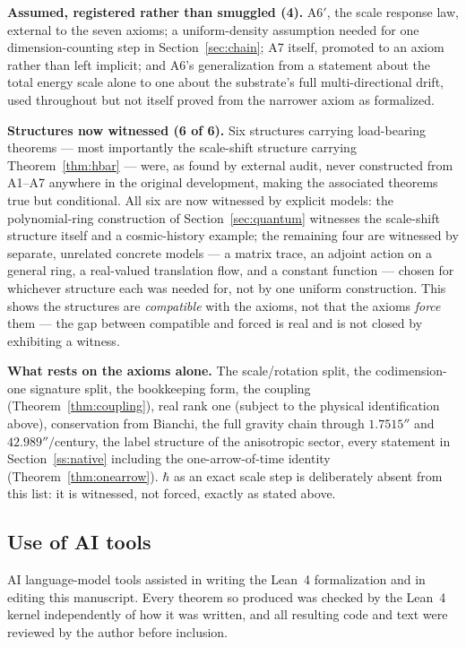 \documentclass[pdflatex,sn-mathphys-num]{sn-jnl}
\theoremstyle{thmstyleone}
\theoremstyle{thmstylethree}
\theoremstyle{thmstyletwo}
\begin{document}
\textbf{Assumed, registered rather than smuggled (4).} A6$'$, the scale
response law, external to the seven axioms; a uniform-density assumption
needed for one dimension-counting step in Section~\ref{sec:chain}; A7
itself, promoted to an axiom rather than left implicit; and A6's
generalization from a statement about the total energy scale alone to
one about the substrate's full multi-directional drift, used throughout
but not itself proved from the narrower axiom as formalized.

\textbf{Structures now witnessed (6 of 6).} Six structures carrying
load-bearing theorems — most importantly the scale-shift structure
carrying Theorem~\ref{thm:hbar} — were, as found by external audit, never
constructed from A1–A7 anywhere in the original development, making the
associated theorems true but conditional. All six are now witnessed by
explicit models: the polynomial-ring construction of
Section~\ref{sec:quantum} witnesses the scale-shift structure itself and
a cosmic-history example; the remaining four are witnessed by separate,
unrelated concrete models — a matrix trace, an adjoint action on a
general ring, a real-valued translation flow, and a constant function —
chosen for whichever structure each was needed for, not by one uniform
construction. This shows the structures are \emph{compatible} with the
axioms, not that the axioms \emph{force} them — the gap between
compatible and forced is real and is not closed by exhibiting a witness.

\textbf{What rests on the axioms alone.} The scale/rotation split, the
codimension-one signature split, the bookkeeping form, the coupling
(Theorem~\ref{thm:coupling}), real rank one (subject to the physical
identification above), conservation from Bianchi, the full gravity
chain through $1.7515''$ and $42.989''/$century, the label structure of
the anisotropic sector, every statement in Section~\ref{ss:native}
including the one-arrow-of-time identity (Theorem~\ref{thm:onearrow}).
$\hbar$ as an exact scale step is deliberately absent from this list: it
is witnessed, not forced, exactly as stated above.

\subsection*{Use of AI tools}

AI language-model tools assisted in writing the Lean~4 formalization
and in editing this manuscript. Every theorem so produced was checked by
the Lean~4 kernel independently of how it was written, and all resulting
code and text were reviewed by the author before inclusion.
\end{document}
